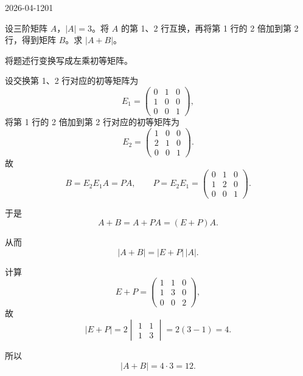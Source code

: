\begin{mistake}{2026-04-12}{01}

\begin{problemcontent}
设三阶矩阵 \(A\)，\(|A|=3\)。将 \(A\) 的第 1、2 行互换，再将第 1 行的 2 倍加到第 2 行，得到矩阵 \(B\)。求 \(|A+B|\)。

\end{problemcontent}

\begin{solutioncontent}
将题述行变换写成左乘初等矩阵。

设交换第 1、2 行对应的初等矩阵为
\[
E_1=\begin{pmatrix}
0&1&0\\
1&0&0\\
0&0&1
\end{pmatrix},
\]
将第 1 行的 2 倍加到第 2 行对应的初等矩阵为
\[
E_2=\begin{pmatrix}
1&0&0\\
2&1&0\\
0&0&1
\end{pmatrix}.
\]
故
\[
B=E_2E_1A=PA,
\qquad
P=E_2E_1=
\begin{pmatrix}
0&1&0\\
1&2&0\\
0&0&1
\end{pmatrix}.
\]

于是
\[
A+B=A+PA=(E+P)A.
\]

从而
\[
|A+B|=|E+P|\,|A|.
\]

计算
\[
E+P=
\begin{pmatrix}
1&1&0\\
1&3&0\\
0&0&2
\end{pmatrix},
\]
故
\[
|E+P|=2\begin{vmatrix}1&1\\1&3\end{vmatrix}=2(3-1)=4.
\]

所以
\[
|A+B|=4\cdot 3=12.
\]

\end{solutioncontent}


\end{mistake}
